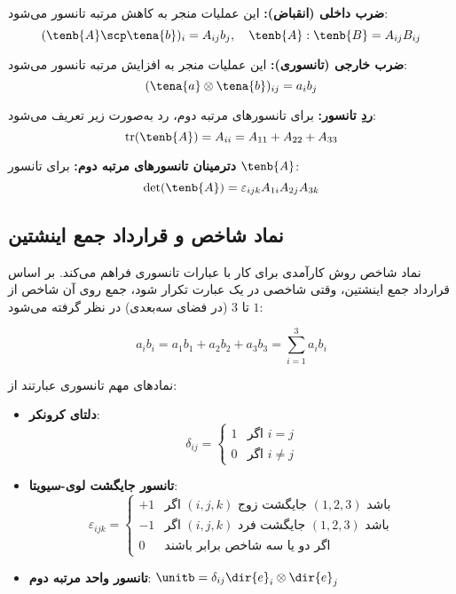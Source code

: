 \textbf{ضرب داخلی (انقباض):} این عملیات منجر به کاهش مرتبه تانسور می‌شود:
\begin{equation}
	(\tenb{A} \scp \tena{b})_i = A_{ij} b_j, \quad \tenb{A} : \tenb{B} = A_{ij} B_{ij}
\end{equation}

\textbf{ضرب خارجی (تانسوری):} این عملیات منجر به افزایش مرتبه تانسور می‌شود:
\begin{equation}
	(\tena{a} \otimes \tena{b})_{ij} = a_i b_j
\end{equation}

\textbf{ردِ تانسور:} برای تانسورهای مرتبه دوم، رد به‌صورت زیر تعریف می‌شود:
\begin{equation}
	\text{tr}(\tenb{A}) = A_{ii} = A_{11} + A_{22} + A_{33}
\end{equation}

\textbf{دترمینان تانسورهای مرتبه دوم:} برای تانسور $\tenb{A}$:
\begin{equation}
	\det(\tenb{A}) = \varepsilon_{ijk} A_{1i} A_{2j} A_{3k}
\end{equation}

\subsection{نماد شاخص و قرارداد جمع اینشتین}

نماد شاخص روش کارآمدی برای کار با عبارات تانسوری فراهم می‌کند. بر اساس قرارداد جمع اینشتین، وقتی شاخصی در یک عبارت تکرار شود، جمع روی آن شاخص از $1$ تا $3$ (در فضای سه‌بعدی) در نظر گرفته می‌شود:

\begin{equation}
	a_i b_i = a_1 b_1 + a_2 b_2 + a_3 b_3 = \sum_{i=1}^{3} a_i b_i
\end{equation}

نمادهای مهم تانسوری عبارتند از:

\begin{itemize}
	\item \textbf{دلتای کرونکر}:
	      \begin{equation}
		      \delta_{ij} = \begin{cases} 1 & \text{اگر } i = j \\ 0 & \text{اگر } i \neq j \end{cases}
	      \end{equation}

	\item \textbf{تانسور جایگشت لوی-سیویتا}:
	      \begin{equation}
		      \varepsilon_{ijk} = \begin{cases}
			      +1 & \text{اگر } (i,j,k) \text{ جایگشت زوج } (1,2,3) \text{ باشد} \\
			      -1 & \text{اگر } (i,j,k) \text{ جایگشت فرد } (1,2,3) \text{ باشد} \\
			      0  & \text{اگر دو یا سه شاخص برابر باشند}
		      \end{cases}
	      \end{equation}

	\item \textbf{تانسور واحد مرتبه دوم}: $\unitb = \delta_{ij} \dir{e}_i \otimes \dir{e}_j$
\end{itemize}

